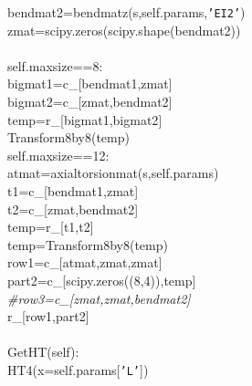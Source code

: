 {{\begin{tabbing}
\hspace{60pt}bendmat2=bendmatz(s,self.params,{\texttt{{'}EI2{'}}})
\\
\hspace{60pt}zmat=scipy.zeros(scipy.shape(bendmat2))
\\
\hspace{45pt}
\\
\hspace{5pt}self.maxsize==8:
\\
\hspace{60pt}bigmat1=c\_{[}bendmat1,zmat{]}
\\
\hspace{60pt}bigmat2=c\_{[}zmat,bendmat2{]}
\\
\hspace{60pt}temp=r\_{[}bigmat1,bigmat2{]}
\\
\hspace{5pt}Transform8by8(temp)
\\
\hspace{5pt}self.maxsize==12:
\\
\hspace{60pt}atmat=axialtorsionmat(s,self.params)
\\
\hspace{60pt}t1=c\_{[}bendmat1,zmat{]}
\\
\hspace{60pt}t2=c\_{[}zmat,bendmat2{]}
\\
\hspace{60pt}temp=r\_{[}t1,t2{]}
\\
\hspace{60pt}temp=Transform8by8(temp)
\\
\hspace{60pt}row1=c\_{[}atmat,zmat,zmat{]}
\\
\hspace{60pt}part2=c\_{[}scipy.zeros((8,4)),temp{]}
\\
{\it{\#\hspace{80pt}row3=c\_{[}zmat,zmat,bendmat2{]}
}}\\
\hspace{5pt}r\_{[}row1,\hspace{5pt}part2{]}
\\

\\
\hspace{5pt}GetHT(self):
\\
\hspace{5pt}HT4(x=self.params{[}{\texttt{{'}L{'}}}{]})
\\


\end{tabbing}}}
